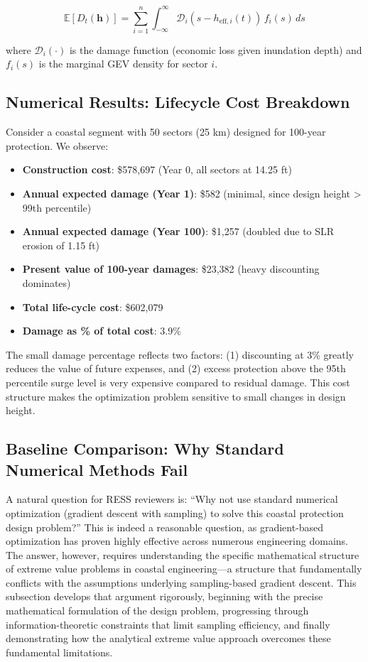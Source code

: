 \documentclass[review]{elsarticle}
\begin{document}
\begin{equation}
\mathbb{E}[D_t(\mathbf{h})] = \sum_{i=1}^{n} \int_{-\infty}^{\infty} \mathcal{D}_i(s - h_{\text{eff},i}(t)) \, f_i(s) \, ds
\label{eq:damage_with_slr}
\end{equation}

where $\mathcal{D}_i(\cdot)$ is the damage function (economic loss given inundation depth) and $f_i(s)$ is the marginal GEV density for sector $i$.

\subsection{Numerical Results: Lifecycle Cost Breakdown}

Consider a coastal segment with 50 sectors (25 km) designed for 100-year protection. We observe:

\begin{itemize}
\item \textbf{Construction cost}: \$578,697 (Year 0, all sectors at 14.25 ft)
\item \textbf{Annual expected damage (Year 1)}: \$582 (minimal, since design height > 99th percentile)
\item \textbf{Annual expected damage (Year 100)}: \$1,257 (doubled due to SLR erosion of 1.15 ft)
\item \textbf{Present value of 100-year damages}: \$23,382 (heavy discounting dominates)
\item \textbf{Total life-cycle cost}: \$602,079
\item \textbf{Damage as \% of total cost}: 3.9\%
\end{itemize}

The small damage percentage reflects two factors: (1) discounting at 3\% greatly reduces the value of future expenses, and (2) excess protection above the 95th percentile surge level is very expensive compared to residual damage. This cost structure makes the optimization problem sensitive to small changes in design height.

\subsection{Baseline Comparison: Why Standard Numerical Methods Fail}

A natural question for RESS reviewers is: ``Why not use standard numerical optimization (gradient descent with sampling) to solve this coastal protection design problem?'' This is indeed a reasonable question, as gradient-based optimization has proven highly effective across numerous engineering domains. The answer, however, requires understanding the specific mathematical structure of extreme value problems in coastal engineering---a structure that fundamentally conflicts with the assumptions underlying sampling-based gradient descent. This subsection develops that argument rigorously, beginning with the precise mathematical formulation of the design problem, progressing through information-theoretic constraints that limit sampling efficiency, and finally demonstrating how the analytical extreme value approach overcomes these fundamental limitations.
\end{document}
